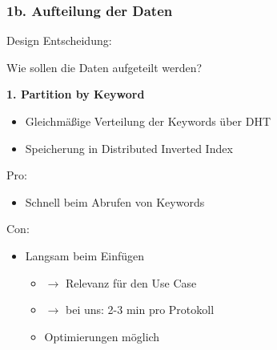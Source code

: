 \documentclass{beamer}
\begin{document}
\begin{frame}[allowframebreaks]
  \frametitle{1b. Aufteilung der Daten}

  Design Entscheidung:

  Wie sollen die Daten aufgeteilt werden?

  \break





  \textbf{1. Partition by Keyword}

  \begin{itemize}
    \item Gleichmäßige Verteilung der Keywords über DHT
    \item Speicherung in Distributed Inverted Index
  \end{itemize}

  \bigskip

  Pro:
  \begin{itemize}
    \item Schnell beim Abrufen von Keywords
  \end{itemize}

  Con:
  \begin{itemize}
    \item Langsam beim Einfügen
      \begin{itemize}
        \item $\rightarrow$ Relevanz für den Use Case
        \item $\rightarrow$ bei uns: 2-3 min pro Protokoll
        \item Optimierungen möglich
      \end{itemize}
  \end{itemize}

  \break


\end{frame}
\end{document}
